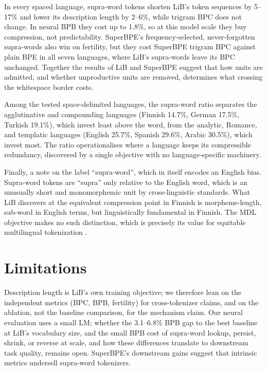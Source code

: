 \documentclass[pdflatex,sn-apa]{sn-jnl}
\begin{document}
In every spaced language, supra-word tokens shorten LiB's token sequences by
5--17\% and lower its description length by 2--6\%, while trigram BPC does not
change. In neural BPB they cost up to 1.8\%, so at this model scale they buy
compression, not predictability.
SuperBPE's frequency-selected, never-forgotten supra-words also win on
fertility, but they cost SuperBPE trigram BPC against plain BPE in all seven
languages, where LiB's supra-words leave its BPC unchanged.
Together the results of LiB and SuperBPE suggest that how units are admitted,
and whether unproductive units are removed, determines what crossing the
whitespace border costs.

Among the tested space-delimited languages, the supra-word ratio separates
the agglutinative and compounding languages (Finnish 14.7\%, German 17.5\%,
Turkish 19.1\%), which invest least above the word, from the analytic,
Romance, and templatic languages (English 25.7\%, Spanish 29.6\%, Arabic
30.5\%), which invest most.
The ratio operationalises where a language keeps its compressible
redundancy, discovered by a single objective with no language-specific
machinery.

Finally, a note on the label ``supra-word'', which in itself encodes an English bias. Supra-word tokens are ``supra'' only relative to the English word, which is an unusually short and
monomorphemic unit by cross-linguistic standards.
What LiB discovers at the equivalent compression point in Finnish is
morpheme-length, sub-word in English terms, but linguistically fundamental
in Finnish.
The MDL objective makes no such distinction, which is precisely its value
for equitable multilingual tokenization
\citep{petrov2023unfairness,ahia2023languages}.

\section{Limitations}

Description length is LiB's own training objective; we therefore lean on the independent
metrics (BPC, BPB, fertility) for cross-tokenizer claims, and on the
ablation, not the baseline comparison, for the mechanism claim.
Our neural evaluation uses a small LM; whether the 3.1--6.8\% BPB gap to the
best baseline at LiB's vocabulary size, and the small BPB cost of supra-word
lookup, persist, shrink, or reverse at scale, and how these
differences translate to downstream task quality, remains open. SuperBPE's
downstream gains \citep{liu2025superbpe} suggest that intrinsic metrics
undersell supra-word tokenizers.
\end{document}
